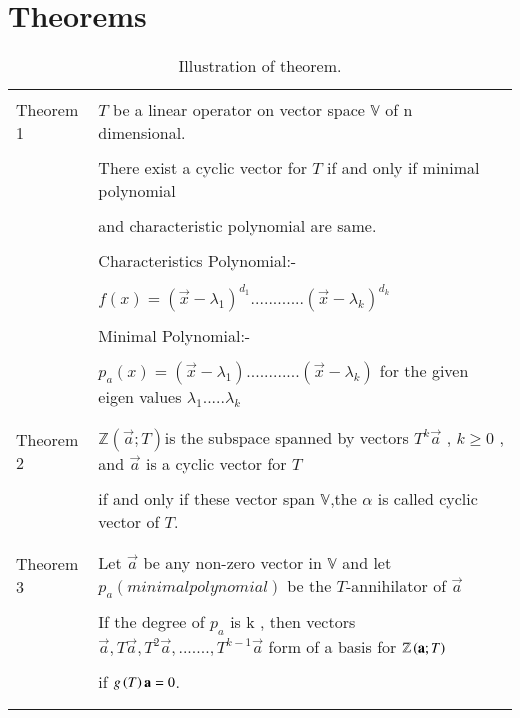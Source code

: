 \documentclass[journal,12pt]{IEEEtran}
\begin{document}
\section{\textbf{Theorems}}
\renewcommand{\thetable}{1}
\begin{longtable}{|l|l|}
\hline
\multirow{3}{*}{Theorem 1} & \\
&$T$ be a linear operator on vector space $\mathbb{V}$ of n dimensional.\\
&\\
&There exist a cyclic vector for $T$ if and only if minimal polynomial\\
&\\
&and characteristic polynomial are same.\\
&\\
&Characteristics Polynomial:-\\
&\\
&$f(x)=(\vec{x}-\lambda_1)^{d_1}............(\vec{x}-\lambda_k)^{d_k}$ \\
&\\
&Minimal Polynomial:-\\
&\\
&$p_a(x)=(\vec{x}-\lambda_1)............(\vec{x}-\lambda_k)$ for the given eigen values $\lambda_1.....\lambda_k$\\
&\\
\hline
\multirow{3}{*}{Theorem 2} & \\
&$\mathbb{Z}(\vec{a};T) $is the subspace spanned by vectors $T^k\vec{a}$ , $k\geq 0$ , and $\vec{a}$ is a cyclic vector for $T$\\
&\\
&if and only if these vector span $\mathbb{V}$,the $\alpha$ is called cyclic vector of $T$.\\ 
&\\
\hline
\multirow{3}{*}{Theorem 3} & \\
&Let $\vec{a}$ be any non-zero vector in $\mathbb{V}$ and let $p_a(minimal polynomial)$ be the $T$-annihilator of $\vec{a}$\\
Cyclic Base
&\\
&If the degree of $p_a$ is k , then vectors $\vec{a},T\vec{a},T^2\vec{a},.......,T^{k-1}\vec{a}$ form of a basis  for $\mathbb{Z}\left(\mathbf{a};T\right)$ \\
&\\
&if $g\left(T\right)\mathbf{a}=0$.\\
&\\
\hline
\caption{Illustration of theorem.}
\label{table:1}
\end{longtable}
\newpage
\end{document}
